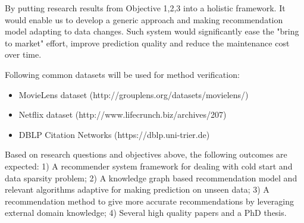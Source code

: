 By putting research results from Objective 1,2,3 into a holistic framework. It would enable us to develop a generic approach and making recommendation model adapting to data changes. Such system would significantly ease the "bring to market" effort, improve prediction quality and reduce the maintenance cost over time. 

Following common datasets will be used for method verification: 

\begin{itemize}

\item MovieLens dataset (http://grouplens.org/datasets/movielens/) 

\item Netflix dataset (http://www.lifecrunch.biz/archives/207) 

\item DBLP Citation Networks (https://dblp.uni-trier.de)  

\end{itemize}

Based on research questions and objectives above, the following outcomes are expected:
1) A recommender system framework for dealing with cold start and data sparsity problem; 
2) A knowledge graph based recommendation model and relevant algorithms adaptive for making prediction on unseen data;
3) A recommendation method to give more accurate recommendations by leveraging external domain knowledge;
4) Several high quality papers and a PhD thesis.